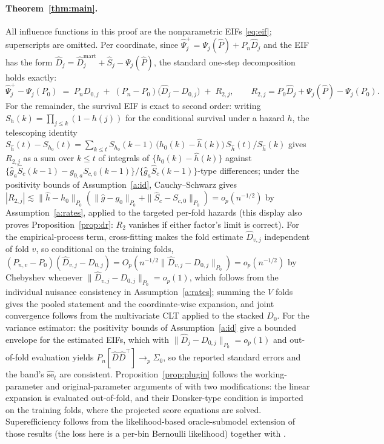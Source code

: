 \documentclass[11pt]{article}
\theoremstyle{remark}
\newcommand{\Pn}{P_n}
\begin{document}
\paragraph{Theorem~\ref{thm:main}.} All influence functions in this proof are the nonparametric EIFs \eqref{eq:eif}; superscripts are omitted. Per coordinate, since $\widehat\Psi^{+}_j = \Psi_j(\hat P) + \Pn\widehat D_j$ and the EIF has the form $\widehat D_j = \widehat D_j^{\mathrm{mart}} + \hat S_j - \Psi_j(\hat P)$, the standard one-step decomposition holds exactly:
\[
\widehat\Psi^{+}_j - \Psi_j(P_0) \;=\; \Pn D_{0,j} \;+\; (\Pn - P_0)\big(\widehat D_j - D_{0,j}\big) \;+\; R_{2,j},
\qquad R_{2,j} = P_0 \widehat D_j + \Psi_j(\hat P) - \Psi_j(P_0).
\]
For the remainder, the survival EIF is exact to second order: writing $S_{h}(k)=\prod_{j\le k}(1-h(j))$ for the conditional survival under a hazard $h$, the telescoping identity
$S_{\hat h}(t) - S_{h_0}(t) = \sum_{k\le t} S_{h_0}(k-1)\,\big(h_0(k)-\hat h(k)\big)\,S_{\hat h}(t)/S_{\hat h}(k)$
gives $R_{2,j}$ as a sum over $k\le t$ of integrals of $\{h_0(k) - \hat h(k)\}$ against $\{\hat g_a\hat S_c(k-1) - g_{0,a} S_{c,0}(k-1)\}/\{\hat g_a \hat S_c(k-1)\}$-type differences; under the positivity bounds of Assumption~\ref{a:id}, Cauchy--Schwarz gives $|R_{2,j}| \lesssim \|\hat h - h_0\|_{P_0}(\|\hat g - g_0\|_{P_0} + \|\hat S_c - S_{c,0}\|_{P_0}) = o_p(n^{-1/2})$ by Assumption~\ref{a:rates}, applied to the targeted per-fold hazards (this display also proves Proposition~\ref{prop:dr}: $R_2$ vanishes if either factor's limit is correct). For the empirical-process term, cross-fitting makes the fold estimate $\widehat D_{v,j}$ independent of fold $v$, so conditional on the training folds, $(P_{n,v} - P_0)(\widehat D_{v,j} - D_{0,j}) = O_p(n^{-1/2}\|\widehat D_{v,j} - D_{0,j}\|_{P_0}) = o_p(n^{-1/2})$ by Chebyshev whenever $\|\widehat D_{v,j} - D_{0,j}\|_{P_0} = o_p(1)$, which follows from the individual nuisance consistency in Assumption~\ref{a:rates}; summing the $V$ folds gives the pooled statement and the coordinate-wise expansion, and joint convergence follows from the multivariate CLT applied to the stacked $D_0$. For the variance estimator: the positivity bounds of Assumption~\ref{a:id} give a bounded envelope for the estimated EIFs, which with $\|\widehat D_j - D_{0,j}\|_{P_0} = o_p(1)$ and out-of-fold evaluation yields $\Pn[\widehat D\widehat D^\top] \to_p \Sigma_0$, so the reported standard errors and the band's $\widehat{\mathrm{se}}_t$ are consistent. Proposition~\ref{prop:plugin} follows the working-parameter and original-parameter arguments of \citet{li2025tda} with two modifications: the linear expansion is evaluated out-of-fold, and their Donsker-type condition is imported on the training folds, where the projected score equations are solved. Superefficiency follows from the likelihood-based oracle-submodel extension of those results (the loss here is a per-bin Bernoulli likelihood) together with \citet{vdl2023adml}.
\end{document}
